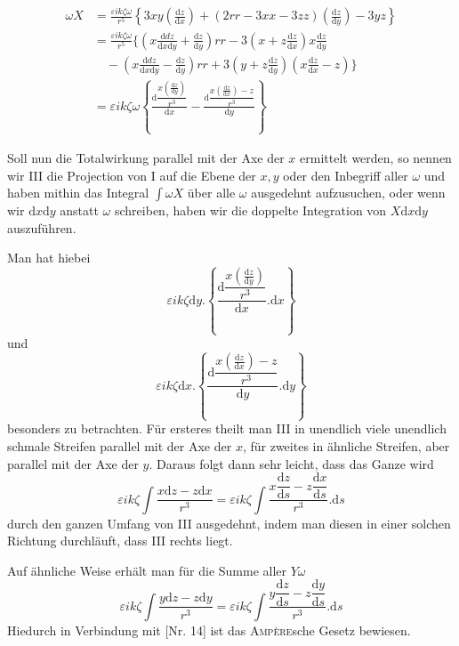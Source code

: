 \[
\begin{aligned}
\omega X&=\frac{\varepsilon ik\zeta\omega}{r^5}\left\{3xy\left(\frac{\mathrm dz}{\mathrm dx}\right)+(2rr-3xx-3zz)\left(\frac{\mathrm dz}{\mathrm dy}\right)-3yz\right\}\\
&=\frac{\varepsilon ik\zeta\omega}{r^5}\Big\{\left(x\frac{\mathrm ddz}{\mathrm dx\mathrm dy}+\frac{\mathrm dz}{\mathrm dy}\right)rr-3\left(x+z\frac{\mathrm dz}{\mathrm dx}\right)x\frac{\mathrm dz}{\mathrm dy}\\
&\quad-\left(x\frac{\mathrm ddz}{\mathrm dx\mathrm dy}-\frac{\mathrm dz}{\mathrm dy}\right)rr+3\left(y+z\frac{\mathrm dz}{\mathrm dy}\right)\left(x\frac{\mathrm dz}{\mathrm dx}-z\right)\Big\}\\
&=\varepsilon ik\zeta\omega\left\{\frac{\mathrm d\dfrac{x\left(\frac{\mathrm dz}{\mathrm dy}\right)}{r^3}}{\mathrm dx}-\frac{\mathrm d\dfrac{x\left(\frac{\mathrm dz}{\mathrm dx}\right)-z}{r^3}}{\mathrm dy}\right\}
\end{aligned}
\]

Soll nun die Totalwirkung parallel mit der Axe der $x$ ermittelt werden, so nennen wir III die Projection von I auf die Ebene der $x,y$ oder den Inbegriff aller $\omega$ und haben mithin das Integral $\int\omega X$ über alle $\omega$ ausgedehnt aufzusuchen, oder wenn wir $\mathrm dx\mathrm dy$ anstatt $\omega$ schreiben, haben wir die doppelte Integration von $X\mathrm dx\mathrm dy$ auszuführen.

Man hat hiebei
\[
\varepsilon ik\zeta\mathrm dy.\left\{\frac{\mathrm d\dfrac{x\left(\frac{\mathrm dz}{\mathrm dy}\right)}{r^3}}{\mathrm dx}.\mathrm dx\right\}
\]
und
\[
\varepsilon ik\zeta\mathrm dx.\left\{\frac{\mathrm d\dfrac{x\left(\frac{\mathrm dz}{\mathrm dx}\right)-z}{r^3}}{\mathrm dy}.\mathrm dy\right\}
\]
besonders zu betrachten. Für ersteres theilt man III in unendlich viele unendlich schmale Streifen parallel mit der Axe der $x$, für zweites in ähnliche Streifen, aber parallel mit der Axe der $y$. Daraus folgt dann sehr leicht, dass das Ganze wird
\[
\varepsilon ik\zeta\int\frac{x\mathrm dz-z\mathrm dx}{r^3}=\varepsilon ik\zeta\int\frac{x\dfrac{\mathrm dz}{\mathrm ds}-z\dfrac{\mathrm dx}{\mathrm ds}}{r^3}.\mathrm ds
\]
durch den ganzen Umfang von III ausgedehnt, indem man diesen in einer solchen Richtung durchläuft, dass III rechts liegt.

Auf ähnliche Weise erhält man für die Summe aller $Y\omega$
\[
\varepsilon ik\zeta\int\frac{y\mathrm dz-z\mathrm dy}{r^3}=\varepsilon ik\zeta\int\frac{y\dfrac{\mathrm dz}{\mathrm ds}-z\dfrac{\mathrm dy}{\mathrm ds}}{r^3}.\mathrm ds
\]
Hiedurch in Verbindung mit [Nr. 14] ist das \textsc{Ampère}sche Gesetz bewiesen.

